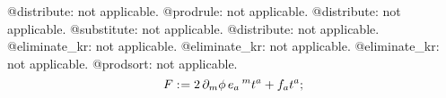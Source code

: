 \documentclass[11pt]{article}
\def\specialcolon{\mathrel{\mathop{:}}\hspace{-.5em}}
\begin{document}
@distribute: not applicable.
@prodrule: not applicable.
@distribute: not applicable.
@substitute: not applicable.
@distribute: not applicable.
@eliminate\_kr: not applicable.
@eliminate\_kr: not applicable.
@eliminate\_kr: not applicable.
@prodsort: not applicable.
\begin{dmath*}[compact, spread=2pt]
F\specialcolon{}= 2\, {\partial}_{m}{\phi}\,  {e}_{a}\,^{m} {t}^{a} + {f}_{a} {t}^{a};
\end{dmath*}
\end{document}
